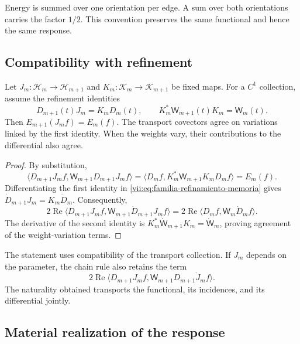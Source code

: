 Energy is summed over one orientation per edge. A sum over both
orientations carries the factor \(1/2\). This convention preserves the same
functional and hence the same response.

\subsection{Compatibility with refinement}
\label{vii:subsec:refinamiento-respuesta}

\begin{theorem}
\label{vii:thm:refinamiento-respuesta}
Let \(J_m:\mathcal H_m\to\mathcal H_{m+1}\) and
\(K_m:\mathcal K_m\to\mathcal K_{m+1}\) be fixed maps.
For a \(C^1\) collection, assume the refinement identities
\begin{equation}
 D_{m+1}(t)J_m=K_mD_m(t),\qquad
 K_m^*\mathsf W_{m+1}(t)K_m=\mathsf W_m(t).
 \label{vii:eq:familia-refinamiento-memoria}
\end{equation}
Then \(E_{m+1}(J_mf)=E_m(f)\).
The transport covectors agree on variations linked
by the first identity. When the weights vary, their contributions
to the differential also agree.
\end{theorem}

\begin{proof}
By substitution,
\[
 \langle D_{m+1}J_mf,\mathsf W_{m+1}D_{m+1}J_mf\rangle
 =\langle D_mf,K_m^*\mathsf W_{m+1}K_mD_mf\rangle=E_m(f).
\]
Differentiating the first identity in
\eqref{vii:eq:familia-refinamiento-memoria} gives
\(\dot D_{m+1}J_m=K_m\dot D_m\). Consequently,
\[
 2\operatorname{Re}
 \langle D_{m+1}J_mf,\mathsf W_{m+1}\dot D_{m+1}J_mf\rangle
 =2\operatorname{Re}\langle D_mf,\mathsf W_m\dot D_mf\rangle.
\]
The derivative of the second identity is
\(K_m^*\dot{\mathsf W}_{m+1}K_m=\dot{\mathsf W}_m\), proving
agreement of the weight-variation terms.
\end{proof}

The statement uses compatibility of the transport collection.
If \(J_m\) depends on the parameter, the chain rule also retains
the term
\[
 2\operatorname{Re}
 \langle D_{m+1}J_mf,\mathsf W_{m+1}D_{m+1}\dot J_mf\rangle.
\]
The naturality obtained transports the functional, its incidences,
and its differential jointly.

\subsection{Material realization of the response}
\label{vii:subsec:realizacion-respuesta-discreta}

